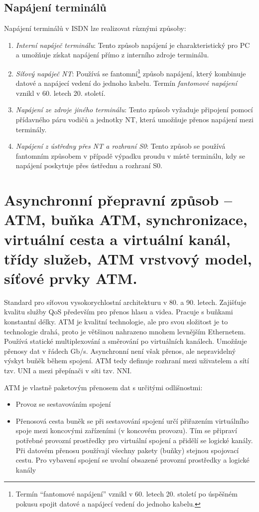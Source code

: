 \subsection{Napájení terminálů}
Napájení terminálů v ISDN lze realizovat různými způsoby:

\begin{enumerate}
    \item \emph{Interní napáječ terminálu}: Tento způsob napájení je charakteristický pro PC a umožňuje získat napájení přímo z interního zdroje terminálu.
    \item \emph{Síťový napáječ NT}: Používá se fantomní\footnote{Termín \enquote{fantomové napájení} vznikl v 60. letech 20. století po úspěšném pokusu spojit datové a napájecí vedení do jednoho kabelu.} způsob napájení, který kombinuje datové a napájecí vedení do jednoho kabelu. Termín \textit{fantomové napájení} vznikl v 60. letech 20. století.
    \item \emph{Napájení ze zdroje jiného terminálu}: Tento způsob vyžaduje připojení pomocí přídavného páru vodičů a jednotky NT, která umožňuje přenos napájení mezi terminály.
    \item \emph{Napájení z ústředny přes NT a rozhraní S0}: Tento způsob se používá fantomním způsobem v případě výpadku proudu v místě terminálu, kdy se napájení poskytuje přes ústřednu a rozhraní S0.
\end{enumerate}

\clearpage

\section{Asynchronní přepravní způsob -- ATM, buňka ATM, synchronizace, virtuální cesta a virtuální kanál, třídy služeb, ATM vrstvový model, síťové prvky ATM.}

Standard pro síťovou vysokorychlostní architekturu v 80. a 90. letech. Zajišťuje kvalitu služby QoS především pro přenos hlasu a videa. Pracuje s buňkami konstantní délky. ATM je kvalitní technologie, ale pro svou složitost je to technologie drahá, proto je většinou nahrazeno mnohem levnějším Ethernetem. Používá statické multiplexování a směrování po virtuálních kanálech. Umožňuje přenosy dat v řádech Gb/s. Asynchronní není však přenos, ale nepravidelný výskyt buňěk během spojení. ATM tedy definuje rozhraní mezi uživatelem a sítí tzv. UNI a mezi přepínači v síti tzv. NNI.

ATM je vlastně paketovým přenosem dat s určitými odlišnostmi:
\begin{itemize}
    \item Provoz se sestavováním spojení
    \item Přenosová cesta buněk se při sestavování spojení určí přiřazením virtuálního spoje mezi koncovými zařízeními (v koncovém provozu). Tím se připraví potřebné provozní prostředky pro virtuální spojení a přidělí se logické kanály. Při datovém přenosu používají všechny pakety (buňky) stejnou spojovací cestu. Pro vybavení spojení se uvolní obsazené provozní prostředky a logické kanály
\end{itemize}

